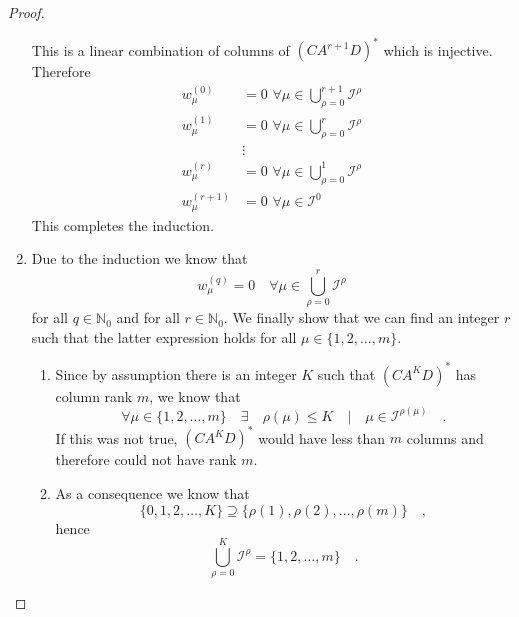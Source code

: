\begin{proof}
\begin{enumerate}
\begin{equation}
			\end{equation}
			This is a linear combination of columns of $(CA^{r+1}D)^*$ which is injective. 
			Therefore
			\begin{align*}
			w_\mu^{(0)} &= 0 \,\,
			\forall \mu \in \bigcup\limits_{\rho =0}^{r+1} \mathcal{I}^\rho  \\
			w_\mu^{(1)} &= 0 \, \,
			\forall \mu \in \bigcup\limits_{\rho =0}^{r} \mathcal{I}^\rho 
			\\	
			&\vdots
			 \\
			w_\mu^{(r)} & = 0 \, \,
			\forall \mu \in  \bigcup\limits_{\rho =0}^{1} \mathcal{I}^\rho \\
			w_\mu^{(r+1)} & = 0 \, \,
			\forall \mu \in  \mathcal{I}^0 
			\end{align*}				
			This completes the induction.
	\item	Due to the induction we know that 
			\begin{equation}
			w_\mu^{(q)} = 0\quad \forall \mu \in \bigcup\limits_{\rho=0}^r \mathcal{I}^\rho
			\end{equation}
			for all $q\in \mathbb{N}_0$ and for all $r\in\mathbb{N}_0$.
			We finally show that we can find an integer $r$ such that the latter 
			expression holds for all $\mu\in\{1,2,\ldots,m\}$.
			\begin{enumerate}
			\item Since by assumption there is an integer $K$ such that $(CA^KD)^*$ has 
			column rank $m$, we know that
			\begin{equation}
			\forall \mu \in \{1,2,\ldots,m\} \quad  \exists \quad \rho(\mu) \leq K 
			\quad | \quad \mu\in 
			\mathcal{I}^{\rho(\mu)} \quad .
			\end{equation}
			If this was not true, $(CA^KD)^*$ would have less than $m$ columns and 
			therefore could not have rank $m$. \\
			\item As a consequence we know that 
			\begin{equation}			
			\{0,1,2,\ldots, K\} \supseteq \{\rho(1),
			\rho(2),\ldots,\rho(m)\} \quad ,
			\end{equation} 
			hence
			\begin{equation}
			\bigcup\limits_{\rho=0}^K \mathcal{I}^\rho = \{1,2,\ldots,m\} \quad .
			\end{equation}
			\end{enumerate}
	\end{enumerate}		
\end{proof}


